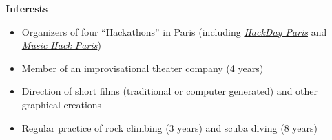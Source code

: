 \documentclass[a4paper,11pt]{article} %
\newcommand{\trad}[2]{#1}
\newcommand{\titre}[1]{%
	\begin{center}
	\par
	\vspace{0.1cm}
        \textbf{\large #1}
	\end{center}
	}
\newenvironment{customitemize}[0]
  { \begin{itemize}
    \addtolength{\itemsep}{\trad{-0.2}{0}\baselineskip}
    \addtolength{\baselineskip}{\trad{-0.2}{0}\baselineskip} }
  { \end{itemize} }
\begin{document}
\titre{\trad{Interests}{Centres d'Intérêts}}


	\begin{customitemize}
	\item \trad{Organizers of four ``Hackathons'' in Paris (including \href{http://www.hackdayparis.org}{\textit{HackDay Paris}} and \href{http://www.musichackparis.org}{\textit{Music Hack Paris}})}{}
	\item \trad{Member of an improvisational theater company (4 years)}           								{Membre d'une troupe d'improvisation théatrale}
	\item \trad{Direction of short films (traditional or computer generated) and other graphical creations}	{Réalisation de courts métrages et autres créations graphiques (voir \href{http://www.steren.fr}{www.steren.fr})} %
	\item \trad{Regular practice of rock climbing (3 years) and scuba diving (8 years)}           				{Pratique régulière de l'escalade et de la plongée sous-marine}
	\end{customitemize}

	

\end{document}
